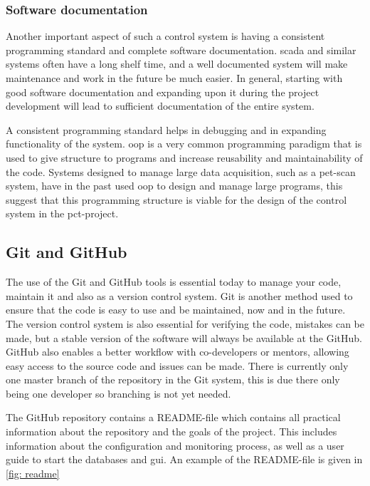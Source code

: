 \documentclass[main.tex]{subfiles}
\begin{document}

\subsubsection{Software documentation}
Another important aspect of such a control system is having a consistent programming standard and complete software documentation. \gls{scada} and similar systems often have a long shelf time, and a well documented system will make maintenance and work in the future be much easier. In general, starting with good software documentation and expanding upon it during the project development will lead to sufficient documentation of the entire system.

A consistent programming standard helps in debugging and in expanding functionality of the system. \gls{oop} is a very common programming paradigm that is used to give structure to programs and increase reusability and maintainability of the code. Systems designed to manage large data acquisition, such as a \gls{pet}-scan system, have in the past used \gls{oop} to design and manage large programs\cite{pet_control_system}, this suggest that this programming structure is viable for the design of the control system in the \gls{pct}-project.



\subsection{Git and GitHub}

The use of the Git and GitHub tools is essential today to manage your code, maintain it and also as a version control system. Git is another method used to ensure that the code is easy to use and be maintained, now and in the future. The version control system is also essential for verifying the code, mistakes can be made, but a stable version of the software will always be available at the GitHub. GitHub also enables a better workflow with co-developers or mentors, allowing easy access to the source code and issues can be made. There is currently only one master branch of the repository in the Git system, this is due there only being one developer so branching is not yet needed.

The GitHub repository contains a README-file which contains all practical information about the repository and the goals of the project. This includes information about the configuration and monitoring process, as well as a user guide to start the databases and \gls{gui}. An example of the README-file is given in \autoref{fig: readme}
\end{document}
